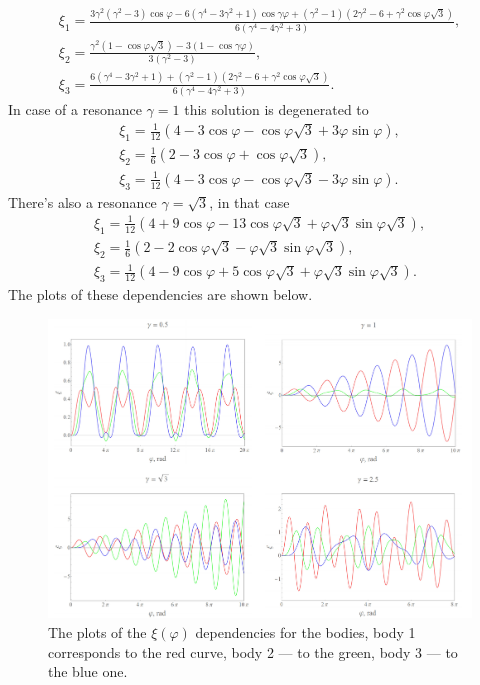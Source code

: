 \documentclass[12pt,a4paper,pdflatex]{disser}
\begin{document}
\begin{gather*}
  \xi_1=\frac{3\gamma^2 \left(\gamma^2-3\right)\cos\varphi -6\left(\gamma^4-3\gamma^2+1\right)\cos\gamma\varphi+\left(\gamma^2-1\right)\left(2\gamma^2-6+\gamma^2 \cos \varphi\sqrt{3}\right)}{6\left(\gamma^4-4\gamma^2+3\right)},\\
  \xi_2=\frac{\gamma^2 \left(1-\cos\varphi\sqrt{3}\right)-3\left(1-\cos\gamma\varphi\right)}{3\left(\gamma^2-3\right)},\\
  \xi_3=\frac{6\left(\gamma^4-3\gamma^2+1\right)+\left(\gamma^2-1\right)\left(2\gamma^2-6+\gamma^2 \cos \varphi\sqrt{3}\right)}{6\left(\gamma^4-4\gamma^2+3\right)}.
\end{gather*}
In case of a resonance $\gamma=1$ this solution is degenerated to
\begin{gather*}
  \xi_1=\frac{1}{12}\left(4-3\cos\varphi-\cos\varphi\sqrt{3}+3\varphi\sin\varphi\right),\\
  \xi_2=\frac{1}{6}\left(2-3\cos\varphi+\cos\varphi\sqrt{3}\right),\\
  \xi_3=\frac{1}{12}\left(4-3\cos\varphi-\cos\varphi\sqrt{3}-3\varphi\sin\varphi\right).
\end{gather*}
There's also a resonance $\gamma=\sqrt3$, in that case
\begin{gather*}
  \xi_1=\frac{1}{12}\left(4+9\cos\varphi-13\cos\varphi\sqrt{3}+\varphi\sqrt3 \sin\varphi\sqrt3\right),\\
  \xi_2=\frac{1}{6}\left(2-2\cos\varphi\sqrt3-\varphi\sqrt{3}\sin\varphi\sqrt3\right),\\
  \xi_3=\frac{1}{12}\left(4-9\cos\varphi+5\cos\varphi\sqrt{3}+\varphi\sqrt3 \sin\varphi\sqrt3\right).
\end{gather*}
The plots of these dependencies are shown below.

\begin{figure}
\begin{center}
\includegraphics[scale=0.6]{plots.pdf}
\end{center}
\caption{The plots of the $\xi(\varphi)$ dependencies for the bodies, body 1 corresponds to the red curve, body 2 --- to the green, body 3 --- to the blue one.}
\end{figure}
\end{document}
